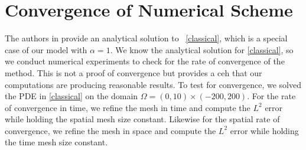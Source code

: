 \documentclass{siamart1116}
\newcommand{\LB}[1]{{\color{blue}~\textsf{#1}}}
\begin{document}
\section{Convergence of Numerical Scheme} \label{s:Convergence}
The authors in \cite{blanchard} provide an analytical solution to 
\LB{\eqref{classical}, which is a special case of our model with $\alpha=1$. We know the analytical solution for \eqref{classical}, so we conduct numerical experiments to check for the rate of convergence of the method. This is not a proof of convergence but provides a ceh that our computations are producing reasonable results.} 
To test for convergence, we solved the PDE in \eqref{classical} on the domain $\Omega=(0,10)\times(-200,200)$. For the rate of convergence in time, we refine the mesh in time and compute the $L^2$ error while holding the spatial mesh size constant. Likewise for the spatial rate of convergence, we refine the mesh in space and compute the $L^2$ error while holding the time mesh size constant.
\end{document}
